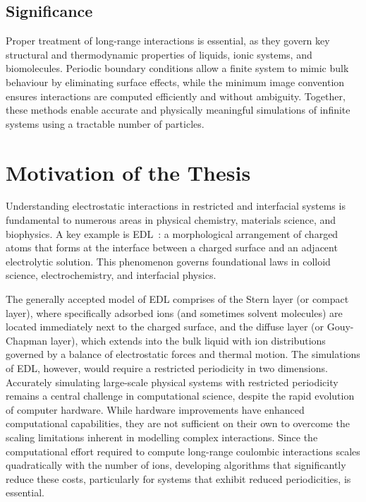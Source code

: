 \subsection{Significance}
Proper treatment of long-range interactions is essential, as they govern key structural and thermodynamic properties of liquids, ionic systems, and biomolecules. Periodic boundary conditions allow a finite system to mimic bulk behaviour by eliminating surface effects, while the minimum image convention ensures interactions are computed efficiently and without ambiguity. Together, these methods enable accurate and physically meaningful simulations of infinite systems using a tractable number of particles.

\section{Motivation of the Thesis}
Understanding electrostatic interactions in restricted and interfacial systems is fundamental to numerous areas in physical chemistry, materials science, and biophysics. A key example is \ac{EDL}~\cite{EDLbook}: a morphological arrangement of charged atoms that forms at the interface between a charged surface and an adjacent electrolytic solution. This phenomenon governs foundational laws in colloid science, electrochemistry, and interfacial physics. 

The generally accepted model of EDL comprises of the Stern layer (or compact layer), where specifically adsorbed ions (and sometimes solvent molecules) are located immediately next to the charged surface, and the diffuse layer (or Gouy-Chapman layer), which extends into the bulk liquid with ion distributions governed by a balance of electrostatic forces and thermal motion. The simulations of EDL, however, would require a restricted periodicity in two dimensions. Accurately simulating large-scale physical systems with restricted periodicity remains a central challenge in computational science, despite the rapid evolution of computer hardware. While hardware improvements have enhanced computational capabilities, they are not sufficient on their own to overcome the scaling limitations inherent in modelling complex interactions. Since the computational effort required to compute long-range coulombic interactions scales quadratically with the number of ions, developing algorithms that significantly reduce these costs, particularly for systems that exhibit reduced periodicities, is essential. 

